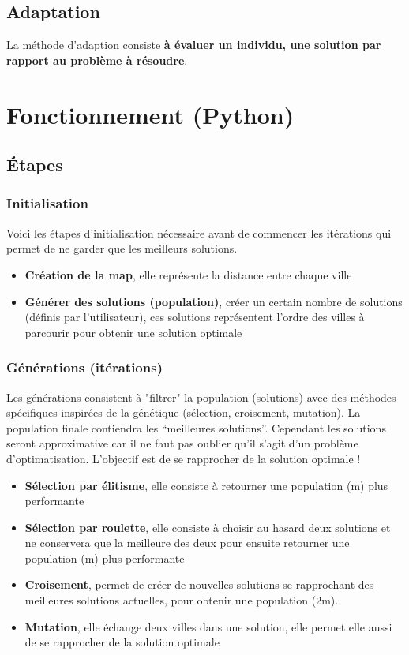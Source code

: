 \documentclass[12pt]{report}
\begin{document}
\section{Adaptation}

La méthode d'adaption consiste \textbf{à évaluer un individu, une solution par rapport au problème à résoudre}.

\cleardoublepage
\chapter{Fonctionnement (Python)}

\section{Étapes}

\subsection{Initialisation}
Voici les étapes d'initialisation nécessaire avant de commencer les itérations qui permet de ne garder que les meilleurs solutions.\\
\begin{itemize}
\item \textbf{Création de la map}, elle représente la distance entre chaque ville
\item \textbf{Générer des solutions (population)}, créer un certain nombre de solutions (définis par l'utilisateur), ces solutions représentent l'ordre des villes à parcourir pour obtenir une solution optimale
\end{itemize}

\subsection{Générations (itérations)}
Les générations consistent à "filtrer" la population (solutions) avec des méthodes spécifiques inspirées de la génétique (sélection, croisement, mutation). La population finale contiendra les ``meilleures solutions''. Cependant les solutions seront approximative car il ne faut pas oublier qu'il s'agit d'un problème d'optimatisation. L'objectif est de se rapprocher de la solution optimale !\\
\begin{itemize}
 \item \textbf{Sélection par élitisme}, elle consiste à retourner une population (m) plus performante
\item \textbf{Sélection par roulette}, elle consiste à choisir au hasard deux solutions et ne conservera
que la meilleure des deux pour ensuite retourner une population (m) plus performante
\item \textbf{Croisement}, permet de créer de nouvelles solutions se rapprochant des meilleures solutions actuelles, pour obtenir une population (2m). 
\item \textbf{Mutation}, elle échange deux villes dans une solution, elle permet elle aussi de se rapprocher de la solution optimale
\end{itemize}
\end{document}
